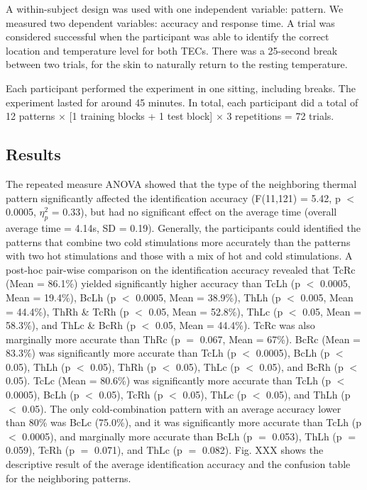 \documentclass[preprint,12pt]{elsarticle}
\begin{document}

A within-subject design was used with one independent variable: pattern. We measured two dependent variables: accuracy and response time. A trial was considered successful when the participant was able to identify the correct location and temperature level for both TECs. There was a 25-second break between two trials, for the skin to naturally return to the resting temperature.

Each participant performed the experiment in one sitting, including breaks. The experiment lasted for around 45 minutes. In total, each participant did a total of 12 patterns $\times$ [1 training blocks + 1 test block] $\times$ 3 repetitions = 72 trials.

\subsection{Results}
The repeated measure ANOVA showed that the type of the neighboring thermal pattern significantly affected the identification accuracy (F(11,121) = 5.42, p $<$ 0.0005, $\eta_p^2$ = 0.33), but had no significant effect on the average time (overall average time = 4.14s, SD = 0.19). Generally, the participants could identified the patterns that combine two cold stimulations more accurately than the patterns with two hot stimulations and those with a mix of hot and cold stimulations. A post-hoc pair-wise comparison on the identification accuracy revealed that TcRc (Mean = 86.1\%) yielded significantly higher accuracy than TcLh (p $<$ 0.0005, Mean = 19.4\%), BcLh (p $<$ 0.0005, Mean = 38.9\%), ThLh (p $<$ 0.005, Mean = 44.4\%), ThRh \& TcRh (p $<$ 0.05, Mean = 52.8\%), ThLc (p $<$ 0.05, Mean = 58.3\%), and ThLc \& BcRh (p $<$ 0.05, Mean = 44.4\%). TcRc was also marginally more accurate than ThRc (p $=$ 0.067, Mean = 67\%). BcRc (Mean = 83.3\%) was significantly more accurate than TcLh (p $<$ 0.0005), BcLh (p $<$ 0.05), ThLh (p $<$ 0.05), ThRh (p $<$ 0.05), ThLc (p $<$ 0.05), and BcRh (p $<$ 0.05). TcLc (Mean = 80.6\%) was significantly more accurate than TcLh (p $<$ 0.0005), BcLh (p $<$ 0.05), TcRh (p $<$ 0.05), ThLc (p $<$ 0.05), and ThLh (p $<$ 0.05). The only cold-combination pattern with an average accuracy lower than 80\% was BcLc (75.0\%), and it was significantly more accurate than TcLh (p $<$ 0.0005), and marginally more accurate than BcLh (p $=$ 0.053), ThLh (p $=$ 0.059), TcRh (p $=$ 0.071), and ThLc (p $=$ 0.082). Fig. XXX shows the descriptive result of the average identification accuracy and the confusion table for the neighboring patterns.
\end{document}

